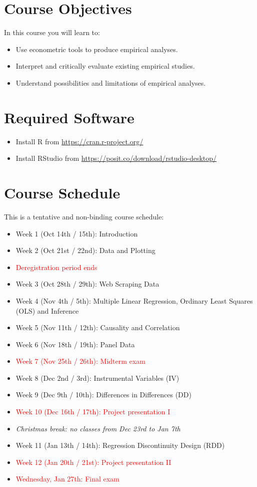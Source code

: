 \documentclass[11pt]{article}
\begin{document}
\section{Course Objectives}
In this course you will learn to:
\begin{itemize}
\item Use econometric tools to produce empirical analyses.
\item Interpret and critically evaluate existing empirical studies.
\item Understand possibilities and limitations of empirical analyses.
\end{itemize}

\section{Required Software}
\begin{itemize}
    \item Install R from \url{https://cran.r-project.org/}
    \item  Install RStudio from \url{https://posit.co/download/rstudio-desktop/}
\end{itemize}

\section{Course Schedule} This is a tentative and non-binding course schedule: 
\begin{itemize} 
    \item Week 1 (Oct 14th / 15th): Introduction 
    \item Week 2 (Oct 21st / 22nd): Data and Plotting 
    \item[\textcolor{red}{$\rightarrow$}] \textcolor{red}{Deregistration period ends} 
    \item Week 3 (Oct 28th / 29th): Web Scraping Data 
    \item Week 4 (Nov 4th / 5th): Multiple Linear Regression, Ordinary Least Squares (OLS) and Inference 
    \item Week 5 (Nov 11th / 12th): Causality and Correlation 
    \item Week 6 (Nov 18th / 19th): Panel Data 
    \item[\textcolor{red}{$\rightarrow$}] \textcolor{red}{Week 7 (Nov 25th / 26th): Midterm exam} 
    \item Week 8 (Dec 2nd / 3rd): Instrumental Variables (IV) 
    \item Week 9 (Dec 9th / 10th): Differences in Differences (DD) 
    \item[\textcolor{red}{$\rightarrow$}] \textcolor{red}{Week 10 (Dec 16th / 17th): Project presentation I}
    \item[] \textit{Christmas break: no classes from Dec 23rd to Jan 7th}
    \item Week 11 (Jan 13th / 14th): Regression Discontinuity Design (RDD) 
    \item[\textcolor{red}{$\rightarrow$}] \textcolor{red}{Week 12 (Jan 20th / 21st): Project presentation II}
    \item[\textcolor{red}{$\rightarrow$}] \textcolor{red}{Wednesday, Jan 27th: Final exam}
\end{itemize}
\end{document}

